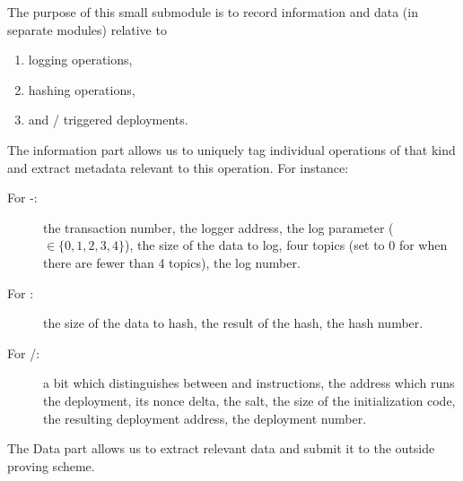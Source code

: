 The purpose of this small submodule is to record information and data (in separate modules) relative to
\begin{enumerate}
	\item logging operations,
	\item hashing operations,
	\item and  /  triggered deployments.
\end{enumerate}
The information part allows us to uniquely tag individual operations of that kind and extract metadata relevant to this operation. For instance:
\begin{description}
	\item[For -:] the transaction number, the logger address, the log parameter ($\in\{0,1,2,3,4\}$), the size of the data to log, four topics (set to 0 for when there are fewer than 4 topics), the log number.
	\item[For :] the size of the data to hash, the result of the hash, the hash number.
	\item[For /:] a bit which distinguishes between  and  instructions, the address which runs the deployment, its nonce delta, the salt, the size of the initialization code, the resulting deployment address, the deployment number.
\end{description}
The Data part allows us to extract relevant data and submit it to the outside proving scheme.
